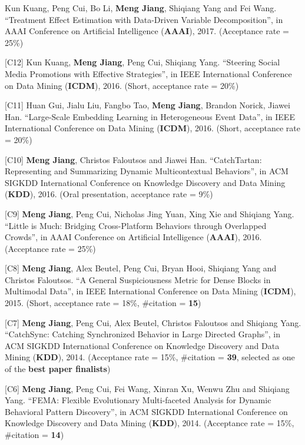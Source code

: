 \documentclass[margin, 10pt]{res}
\begin{document}
\begin{resume}
[C13] Kun Kuang, Peng Cui, Bo Li, \textbf{Meng Jiang}, Shiqiang Yang and Fei Wang. ``Treatment Effect Estimation with Data-Driven Variable Decomposition'', in AAAI Conference on Artificial Intelligence (\textbf{AAAI}), 2017. (Acceptance rate = 25\%)

[C12] Kun Kuang, \textbf{Meng Jiang}, Peng Cui, Shiqiang Yang. ``Steering Social Media Promotions with Effective Strategies'', in IEEE International Conference on Data Mining (\textbf{ICDM}), 2016. (Short, acceptance rate = 20\%)

[C11] Huan Gui, Jialu Liu, Fangbo Tao, \textbf{Meng Jiang}, Brandon Norick, Jiawei Han. ``Large-Scale Embedding Learning in Heterogeneous Event Data'', in IEEE International Conference on Data Mining (\textbf{ICDM}), 2016. (Short, acceptance rate = 20\%)

[C10] \textbf{Meng Jiang}, Christos Faloutsos and Jiawei Han. ``CatchTartan: Representing and Summarizing Dynamic Multicontextual Behaviors'', in ACM SIGKDD International Conference on Knowledge Discovery and Data Mining (\textbf{KDD}), 2016. (Oral presentation, acceptance rate = 9\%)

[C9] \textbf{Meng Jiang}, Peng Cui, Nicholas Jing Yuan, Xing Xie and Shiqiang Yang. ``Little is Much: Bridging Cross-Platform Behaviors through Overlapped Crowds'', in AAAI Conference on Artificial Intelligence (\textbf{AAAI}), 2016. (Acceptance rate = 25\%)

[C8] \textbf{Meng Jiang}, Alex Beutel, Peng Cui, Bryan Hooi, Shiqiang Yang and Christos Faloutsos. ``A General Suspiciousness Metric for Dense Blocks in Multimodal Data'', in IEEE International Conference on Data Mining (\textbf{ICDM}), 2015. (Short, acceptance rate = 18\%, \#citation = \textbf{15})

[C7] \textbf{Meng Jiang}, Peng Cui, Alex Beutel, Christos Faloutsos and Shiqiang Yang. ``CatchSync: Catching Synchronized Behavior in Large Directed Graphs'', in ACM SIGKDD International Conference on Knowledge Discovery and Data Mining (\textbf{KDD}), 2014. (Acceptance rate = 15\%, \#citation = \textbf{39}, selected as one of the \textbf{best paper finalists})

[C6] \textbf{Meng Jiang}, Peng Cui, Fei Wang, Xinran Xu, Wenwu Zhu and Shiqiang Yang. ``FEMA: Flexible Evolutionary Multi-faceted Analysis for Dynamic Behavioral Pattern Discovery'', in ACM SIGKDD International Conference on Knowledge Discovery and Data Mining (\textbf{KDD}), 2014. (Acceptance rate = 15\%, \#citation = \textbf{14})


\end{resume}
\end{document}
